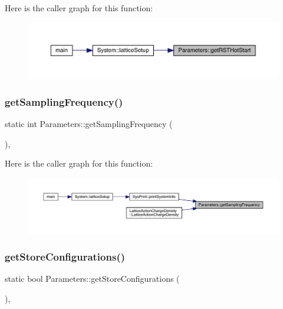Here is the caller graph for this function\+:
\nopagebreak
\begin{figure}[H]
\begin{center}
\leavevmode
\includegraphics[width=350pt]{class_parameters_a4c24cb57765589a12eae030894423735_icgraph}
\end{center}
\end{figure}
\mbox{\label{class_parameters_a3b4e197b2569fb5465e0827430e45eb5}} 
\subsubsection{\texorpdfstring{getSamplingFrequency()}{getSamplingFrequency()}}
{\footnotesize\ttfamily static int Parameters\+::get\+Sampling\+Frequency (\begin{DoxyParamCaption}{ }\end{DoxyParamCaption})\hspace{0.3cm}{\ttfamily [inline]}, {\ttfamily [static]}}

Here is the caller graph for this function\+:
\nopagebreak
\begin{figure}[H]
\begin{center}
\leavevmode
\includegraphics[width=350pt]{class_parameters_a3b4e197b2569fb5465e0827430e45eb5_icgraph}
\end{center}
\end{figure}
\mbox{\label{class_parameters_a38f06b562355b56a1b1222e1cfe6735a}} 
\subsubsection{\texorpdfstring{getStoreConfigurations()}{getStoreConfigurations()}}
{\footnotesize\ttfamily static bool Parameters\+::get\+Store\+Configurations (\begin{DoxyParamCaption}{ }\end{DoxyParamCaption})\hspace{0.3cm}{\ttfamily [inline]}, {\ttfamily [static]}}

